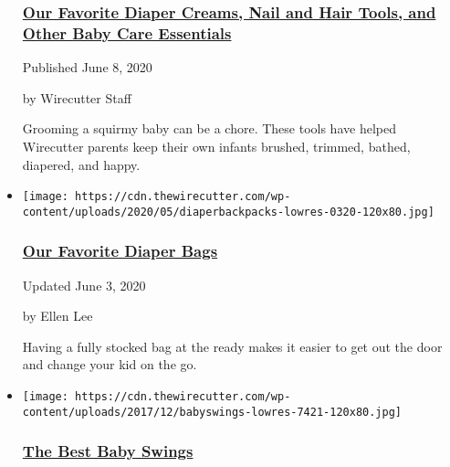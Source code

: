 \begin{itemize}
  \hypertarget{our-favorite-diaper-creams-nail-and-hair-tools-and-other-baby-care-essentials}{%
  \subsubsection{\texorpdfstring{\href{https://www.nytimes3xbfgragh.onion/wirecutter/reviews/baby-care-essentials/}{Our
  Favorite Diaper Creams, Nail and Hair Tools, and Other Baby Care
  Essentials}}{Our Favorite Diaper Creams, Nail and Hair Tools, and Other Baby Care Essentials}}\label{our-favorite-diaper-creams-nail-and-hair-tools-and-other-baby-care-essentials}}

  Published June 8, 2020

  by Wirecutter Staff

  Grooming a squirmy baby can be a chore. These tools have helped
  Wirecutter parents keep their own infants brushed, trimmed, bathed,
  diapered, and happy.
\item
  \href{https://www.nytimes3xbfgragh.onion/wirecutter/reviews/best-diaper-bag/}{}

  \texttt{[image: https://cdn.thewirecutter.com/wp-content/uploads/2020/05/diaperbackpacks-lowres-0320-120x80.jpg]}

  \hypertarget{our-favorite-diaper-bags}{%
  \subsubsection{\texorpdfstring{\href{https://www.nytimes3xbfgragh.onion/wirecutter/reviews/best-diaper-bag/}{Our
  Favorite Diaper
  Bags}}{Our Favorite Diaper Bags}}\label{our-favorite-diaper-bags}}

  Updated June 3, 2020

  by Ellen Lee

  Having a fully stocked bag at the ready makes it easier to get out the
  door and change your kid on the go.
\item
  \href{https://www.nytimes3xbfgragh.onion/wirecutter/reviews/best-baby-swings/}{}

  \texttt{[image: https://cdn.thewirecutter.com/wp-content/uploads/2017/12/babyswings-lowres-7421-120x80.jpg]}

  \hypertarget{the-best-baby-swings}{%
  \subsubsection{\texorpdfstring{\href{https://www.nytimes3xbfgragh.onion/wirecutter/reviews/best-baby-swings/}{The
  Best Baby Swings}}{The Best Baby Swings}}\label{the-best-baby-swings}}


\end{itemize}
